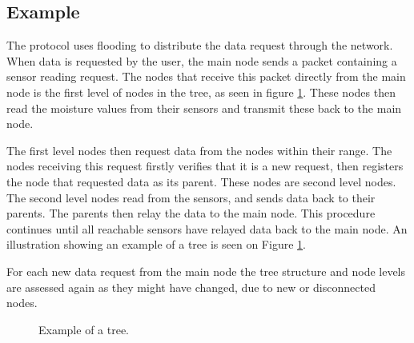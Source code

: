 \subsection*{Example}
The protocol uses flooding to distribute the data request through the network. 
When data is requested by the user, the main node sends a packet containing a sensor reading request. 
The nodes that receive this packet directly from the main node is the first level of nodes in the tree, as seen in figure \ref{fig:prottree1}. 
These nodes then read the moisture values from their sensors and transmit these back to the main node. 

The first level nodes then request data from the nodes within their range. 
The nodes receiving this request firstly verifies that it is a new request, then registers the node that requested data as its parent. 
These nodes are second level nodes. The second level nodes read from the sensors, and sends data back to their parents. The parents then relay the data to the main node. 
This procedure continues until all reachable sensors have relayed data back to the main node.
An illustration showing an example of a tree is seen on Figure \ref{fig:prottree1}.

For each new data request from the main node the tree structure and node levels are assessed again as they might have changed, due to new or disconnected nodes.

\begin{figure}[!h]
	\centering
	\caption{Example of a tree.}
	\label{fig:prottree1}
\end{figure}

